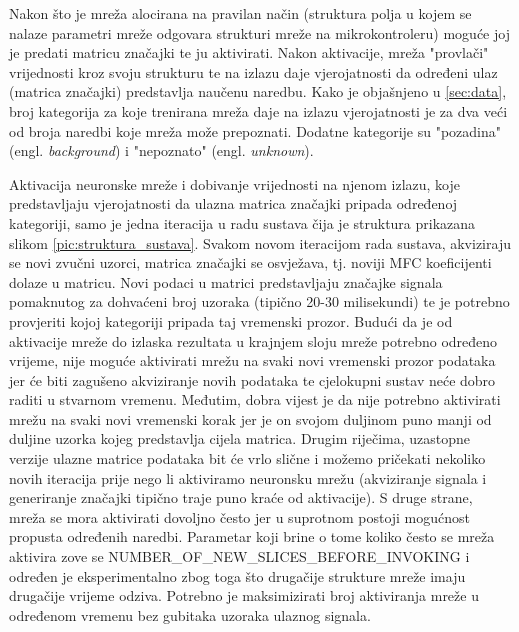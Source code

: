 Nakon što je mreža alocirana na pravilan način (struktura polja u kojem se nalaze parametri
mreže odgovara strukturi mreže na mikrokontroleru) moguće joj je predati matricu značajki
te ju aktivirati. Nakon aktivacije, mreža "provlači" vrijednosti kroz svoju strukturu te na
izlazu daje vjerojatnosti da određeni ulaz (matrica značajki) predstavlja naučenu naredbu. 
Kako je objašnjeno u \ref{sec:data}, broj kategorija za koje trenirana mreža daje na izlazu
vjerojatnosti je za dva veći od broja naredbi koje mreža može prepoznati. Dodatne kategorije
su "pozadina" (engl. \textit{background}) i "nepoznato" (engl. \textit{unknown}). 

Aktivacija neuronske mreže i dobivanje vrijednosti na njenom izlazu, koje predstavljaju
vjerojatnosti da ulazna matrica značajki pripada određenoj kategoriji, samo je jedna iteracija 
u radu sustava čija je struktura prikazana slikom \ref{pic:struktura_sustava}. Svakom novom 
iteracijom rada sustava, akviziraju se novi zvučni uzorci, matrica značajki se osvježava, 
tj. noviji MFC koeficijenti dolaze u matricu. Novi podaci u matrici predstavljaju značajke 
signala pomaknutog za dohvaćeni broj uzoraka (tipično 20-30 milisekundi) te je potrebno provjeriti
kojoj kategoriji pripada taj vremenski prozor. Budući da je od aktivacije mreže do izlaska 
rezultata u krajnjem sloju mreže potrebno određeno vrijeme, nije moguće aktivirati mrežu 
na svaki novi vremenski prozor podataka jer će biti zagušeno akviziranje novih podataka
te cjelokupni sustav neće dobro raditi u stvarnom vremenu. Međutim, dobra vijest je da
nije potrebno aktivirati mrežu na svaki novi vremenski korak jer je on svojom duljinom
puno manji od duljine uzorka kojeg predstavlja cijela matrica. Drugim riječima, uzastopne
verzije ulazne matrice podataka bit će vrlo slične i možemo pričekati nekoliko novih
iteracija prije nego li aktiviramo neuronsku mrežu (akviziranje signala i generiranje značajki
tipično traje puno kraće od aktivacije). S druge strane, mreža se mora aktivirati dovoljno
često jer u suprotnom postoji mogućnost propusta određenih naredbi. Parametar koji brine o tome 
koliko često se mreža aktivira zove se NUMBER\_OF\_NEW\_SLICES\_BEFORE\_INVOKING i određen
je eksperimentalno zbog toga što drugačije strukture mreže imaju drugačije vrijeme odziva.
Potrebno je maksimizirati broj aktiviranja mreže u određenom vremenu bez gubitaka
uzoraka ulaznog signala.

